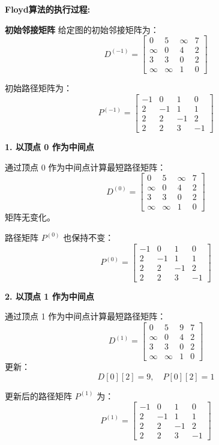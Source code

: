 \documentclass[lang=cn,newtx,10pt,scheme=chinese]{elegantbook}
\begin{document}
\textbf{Floyd算法的执行过程:}
 



\textbf{初始邻接矩阵}
给定图的初始邻接矩阵为：
\[
D^{(-1)} =
\begin{bmatrix}
0 & 5 & \infty & 7 \\
\infty & 0 & 4 & 2 \\
3 & 3 & 0 & 2 \\
\infty & \infty & 1 & 0
\end{bmatrix}
\]

初始路径矩阵为：
\[
P^{(-1)} =
\begin{bmatrix}
-1 & 0 & 1 & 0 \\
2 & -1 & 1 & 1 \\
2 & 2 & -1 & 2 \\
2 & 2 & 3 & -1
\end{bmatrix}
\]


\textbf{1. 以顶点 0 作为中间点}

通过顶点 0 作为中间点计算最短路径矩阵：
\[
D^{(0)} =
\begin{bmatrix}
0 & 5 & \infty & 7 \\
\infty & 0 & 4 & 2 \\
3 & 3 & 0 & 2 \\
\infty & \infty & 1 & 0
\end{bmatrix}
\]
矩阵无变化。

路径矩阵 \( P^{(0)} \) 也保持不变：
\[
P^{(0)} =
\begin{bmatrix}
-1 & 0 & 1 & 0 \\
2 & -1 & 1 & 1 \\
2 & 2 & -1 & 2 \\
2 & 2 & 3 & -1
\end{bmatrix}
\]

\textbf{2. 以顶点 1 作为中间点}

通过顶点 1 作为中间点计算最短路径矩阵：
\[
D^{(1)} =
\begin{bmatrix}
0 & 5 & 9 & 7 \\
\infty & 0 & 4 & 2 \\
3 & 3 & 0 & 2 \\
\infty & \infty & 1 & 0
\end{bmatrix}
\]
更新：
\[
D[0][2] = 9, \quad P[0][2] = 1
\]

更新后的路径矩阵 \( P^{(1)} \) 为：
\[
P^{(1)} =
\begin{bmatrix}
-1 & 0 & 1 & 0 \\
2 & -1 & 1 & 1 \\
2 & 2 & -1 & 2 \\
2 & 2 & 3 & -1
\end{bmatrix}
\]
\end{document}
